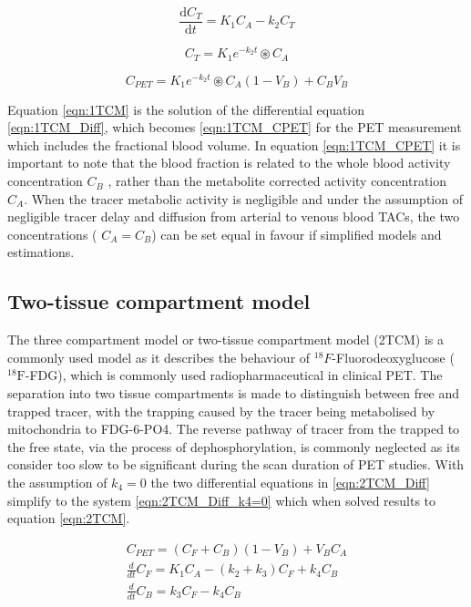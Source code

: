 \begin{equation}
  \frac{\mathrm d C_T}{\mathrm d t} = K_1 C_A - k_2 C_T
  \label{eqn:1TCM_Diff}
\end{equation}

\begin{equation}
   C_T = K_1 e^{-k_2 t} \circledast C_A 
  \label{eqn:1TCM}
\end{equation}

\begin{equation}
   C_{PET} =   K_1 e^{-k_2 t} \circledast C_A  (1-V_B) + C_B V_B
  \label{eqn:1TCM_CPET}
\end{equation}

Equation \ref{eqn:1TCM} is the solution of the differential equation \ref{eqn:1TCM_Diff}, which becomes \ref{eqn:1TCM_CPET} for the PET measurement which includes the fractional blood volume. In equation \ref{eqn:1TCM_CPET} it is important to note that the blood fraction is related to the whole blood activity concentration $C_B$ , rather than the metabolite corrected activity concentration $C_A$. When the tracer metabolic activity is negligible and under the assumption of negligible tracer delay and diffusion from arterial to venous blood TACs, the two concentrations ( $C_A = C_B$) can be set equal in favour if simplified models and estimations. 

\subsection{Two-tissue compartment model}
The three compartment model or two-tissue compartment model (2TCM) is a commonly used model as it describes the behaviour of ${}^{18}F$-Fluorodeoxyglucose (${}^{18}\mathrm{F}$-FDG), which is commonly used radiopharmaceutical in clinical PET. The separation into two tissue compartments is made to distinguish between free and trapped tracer, with the trapping caused by the tracer being metabolised by mitochondria to FDG-6-PO4. The reverse pathway of tracer from the trapped to the free state, via the process of dephosphorylation, is commonly neglected as its consider too slow to be significant during the scan duration of PET studies. With the assumption of $k_4=0$ the two differential equations in \ref{eqn:2TCM_Diff} simplify to the system \ref{eqn:2TCM_Diff_k4=0} which when solved results to equation \ref{eqn:2TCM}. 

\begin{subequations}
\begin{align}
C_{PET} = (C_F + C_B)(1-V_B) + V_B C_A \\
\frac{d}{dt}C_F = K_1 C_A - (k_2 + k_3)C_F + k_4 C_B \\ 
\frac{d}{dt}C_B = k_3 C_F - k_4 C_B  
\end{align}
\label{eqn:2TCM_Diff}
\end{subequations}


